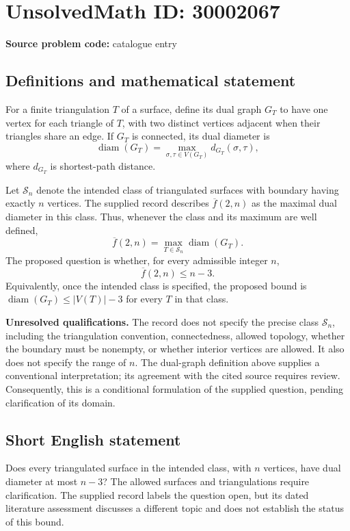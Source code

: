 \documentclass[11pt]{article}
\begin{document}
\section*{UnsolvedMath ID: 30002067}
\textbf{Source problem code:} catalogue entry
\subsection{Definitions and mathematical statement}
For a finite triangulation \(T\) of a surface, define its dual graph \(G_T\) to have one vertex for each triangle of \(T\), with two distinct vertices adjacent when their triangles share an edge. If \(G_T\) is connected, its dual diameter is
\[
\operatorname{diam}(G_T)=\max_{\sigma,\tau\in V(G_T)}d_{G_T}(\sigma,\tau),
\]
where \(d_{G_T}\) is shortest-path distance.

Let \(\mathcal S_n\) denote the intended class of triangulated surfaces with boundary having exactly \(n\) vertices. The supplied record describes \(\overline f(2,n)\) as the maximal dual diameter in this class. Thus, whenever the class and its maximum are well defined,
\[
\overline f(2,n)=\max_{T\in\mathcal S_n}\operatorname{diam}(G_T).
\]
The proposed question is whether, for every admissible integer \(n\),
\[
\overline f(2,n)\leq n-3.
\]
Equivalently, once the intended class is specified, the proposed bound is \(\operatorname{diam}(G_T)\leq |V(T)|-3\) for every \(T\) in that class.

\textbf{Unresolved qualifications.} The record does not specify the precise class \(\mathcal S_n\), including the triangulation convention, connectedness, allowed topology, whether the boundary must be nonempty, or whether interior vertices are allowed. It also does not specify the range of \(n\). The dual-graph definition above supplies a conventional interpretation; its agreement with the cited source requires review. Consequently, this is a conditional formulation of the supplied question, pending clarification of its domain.
\subsection{Short English statement}
Does every triangulated surface in the intended class, with \(n\) vertices, have dual diameter at most \(n-3\)? The allowed surfaces and triangulations require clarification. The supplied record labels the question open, but its dated literature assessment discusses a different topic and does not establish the status of this bound.
\end{document}
